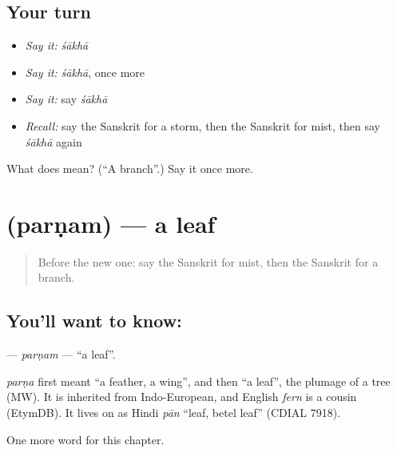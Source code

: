 \subsection*{Your turn}
\begin{itemize}
\raggedright
  \item \emph{Say it:} \emph{śākhā}
  \item \emph{Say it:} \emph{śākhā}, once more
  \item \emph{Say it:} say \emph{śākhā}
  \item \emph{Recall:} say the Sanskrit for a storm, then the Sanskrit for mist, then say \emph{śākhā} again
\end{itemize}

\begin{tcolorbox}[breakable,colback=teal!4,colframe=teal!35!black,title={Before you move on}]
What does  mean? (\textquotedblleft{}A branch\textquotedblright{}.) Say it once more.
\end{tcolorbox}
\section[\texorpdfstring{\sk{पर्णम्} (parṇam)}{पर्णम् (parṇam)}]{ (parṇam) — a leaf}

\label{lesson:SA-C111-parnam}



\begin{quote}
Before the new one: say the Sanskrit for mist, then the Sanskrit for a branch.
\end{quote}

\subsection*{You'll want to know: }
\textbf{} — \emph{parṇam} — \textquotedblleft{}a leaf\textquotedblright{}.

\begin{cousinweb}
\emph{parṇa} first meant \textquotedblleft{}a feather, a wing\textquotedblright{}, and then \textquotedblleft{}a leaf\textquotedblright{}, the plumage of a tree (MW). It is inherited from Indo-European, and English \emph{fern} is a cousin (EtymDB). It lives on as Hindi \emph{pān} \textquotedblleft{}leaf, betel leaf\textquotedblright{} (CDIAL 7918).
\end{cousinweb}

\begin{grammarlens}[title={What you've built}]
One more word for this chapter.
\end{grammarlens}

